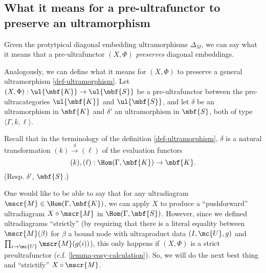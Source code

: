 \subsection{What it means for a pre-ultrafunctor to preserve an ultramorphism}
Given the protytpical diagonal embedding ultramorphisms $\Delta_M$, we can say what it means that a pre-ultrafunctor $(X, \Phi)$ \emph{preserves} diagonal embeddings.


  Analogously, we can define what it means for $(X,\Phi)$ to preserve a general ultramorphism \ref{def-ultramorphism}. Let $(X,\Phi) : \ul{\mbf{K}} \to \ul{\mbf{S}}$ be a pre-ultrafunctor between the pre-ultracategories $\ul{\mbf{K}}$ and $\ul{\mbf{S}}$, and let $\delta$ be an ultramorphism in $\mbf{K}$ and $\delta'$ an ultramorphism in $\mbf{S}$, both of type $\langle \Gamma, k, \ell \rangle$.

Recall that in the terminology of the definition \ref{def-ultramorphism}, $\delta$ is a natural transformation $(k) \overset{\delta}{\to} (\ell)$ of the evaluation functors $$(k), (\ell) : \Hom(\Gamma, \mbf{K}) \to \mbf{K}.$$ (Resp. $\delta'$, $\mbf{S}$.)

One would like to be able to say that for any ultradiagram $\mscr{M} \in \Hom(\Gamma, \mbf{K})$, we can apply $X$ to produce a ``pushforward'' ultradiagram $X \circ \mscr{M}$ in $\Hom(\Gamma, \mbf{S})$. However, since we defined ultradiagrams ``strictly'' (by requiring that there is a literal equality between $\mscr{M}(\beta)$ for $\beta$ a bound node with ultraproduct data $(I, \mc{U}, g)$ and $\prod_{i \to \mc{U}} \mscr{M}(g(i))$), this only happens if $(X, \Phi)$ is a strict preultrafunctor (c.f. \ref{lemma-easy-calculation}). So, we will do the next best thing and ``strictify'' $X \circ \mscr{M}$.

